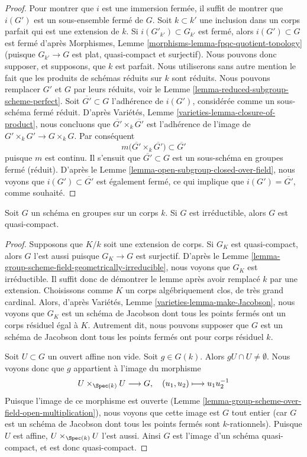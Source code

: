 \begin{proof}
Pour montrer que $i$ est une immersion fermée, il suffit de montrer que
$i(G')$ est un sous-ensemble fermé de $G$. Soit $k \subset k'$ une inclusion dans un corps parfait
qui est une extension de $k$. Si $i(G'_{k'}) \subset G_{k'}$ est fermé, alors
$i(G') \subset G$ est fermé d'après
Morphismes, Lemme \ref{morphisms-lemma-fpqc-quotient-topology}
(puisque $G_{k'} \to G$ est plat, quasi-compact et surjectif).
Nous pouvons donc supposer, et supposons, que $k$ est parfait. Nous utiliserons sans autre
mention le fait que les produits de schémas réduits sur $k$ sont réduits.
Nous pouvons remplacer $G'$ et $G$ par leurs réduits, voir
le Lemme \ref{lemma-reduced-subgroup-scheme-perfect}.
Soit $\overline{G'} \subset G$ l'adhérence de $i(G')$, considérée
comme un sous-schéma fermé réduit. D'après
Variétés, Lemme \ref{varieties-lemma-closure-of-product},
nous concluons que $\overline{G'} \times_k \overline{G'}$
est l'adhérence de l'image de $G' \times_k G' \to G \times_k G$. Par conséquent
$$
m\Big(\overline{G'} \times_k \overline{G'}\Big)
\subset \overline{G'}
$$
puisque $m$ est continu. Il s'ensuit que $\overline{G'} \subset G$
est un sous-schéma en groupes fermé (réduit). D'après
le Lemme \ref{lemma-open-subgroup-closed-over-field},
nous voyons que $i(G') \subset \overline{G'}$ est également fermé,
ce qui implique que $i(G') = \overline{G'}$, comme souhaité.
\end{proof}

\begin{lemma}
\label{lemma-irreducible-group-scheme-over-field-qc}
Soit $G$ un schéma en groupes sur un corps $k$. Si $G$ est irréductible,
alors $G$ est quasi-compact.
\end{lemma}

\begin{proof}
Supposons que $K/k$ soit une extension de corps. Si $G_K$
est quasi-compact, alors $G$ l'est aussi puisque $G_K \to G$ est surjectif.
D'après le Lemme \ref{lemma-group-scheme-field-geometrically-irreducible},
nous voyons que $G_K$ est irréductible. Il suffit donc de démontrer le lemme
après avoir remplacé $k$ par une extension. Choisissons comme $K$ un corps algébriquement
clos, de très grand cardinal. Alors, d'après
Variétés, Lemme \ref{varieties-lemma-make-Jacobson},
nous voyons que $G_K$ est un schéma de Jacobson dont tous les points fermés ont
un corps résiduel égal à $K$. Autrement dit, nous pouvons supposer que $G$ est un
schéma de Jacobson dont tous les points fermés ont pour corps résiduel $k$.

\medskip\noindent
Soit $U \subset G$ un ouvert affine non vide. Soit $g \in G(k)$. Alors
$gU \cap U \not = \emptyset$. Nous voyons donc que $g$ appartient à l'image
du morphisme
$$
U \times_{\Spec(k)} U \longrightarrow G, \quad
(u_1, u_2) \longmapsto u_1u_2^{-1}
$$
Puisque l'image de ce morphisme est ouverte
(Lemme \ref{lemma-group-scheme-over-field-open-multiplication}),
nous voyons que cette image est $G$ tout entier (car $G$ est un schéma de Jacobson
dont tous les points fermés sont $k$-rationnels).
Puisque $U$ est affine, $U \times_{\Spec(k)} U$ l'est aussi. Ainsi $G$ est
l'image d'un schéma quasi-compact, et est donc quasi-compact.
\end{proof}

